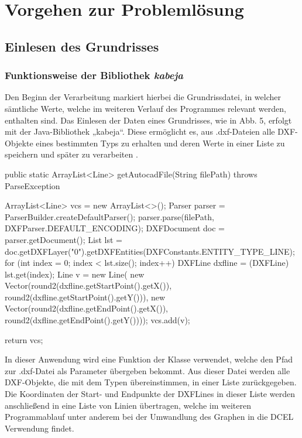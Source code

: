 \chapter{Vorgehen zur Problemlösung}
\section{Einlesen des Grundrisses}

\subsection{Funktionsweise der Bibliothek \textit{kabeja}}
Den Beginn der Verarbeitung markiert hierbei die Grundrissdatei, in welcher sämtliche Werte, welche im weiteren Verlauf des Programmes relevant werden, enthalten sind.
Das Einlesen der Daten eines Grundrisses, wie in Abb. 5, erfolgt mit der Java-Bibliothek „kabeja“. 
Diese ermöglicht es, aus .dxf-Dateien alle DXF-Objekte eines bestimmten Typs zu erhalten und deren Werte in einer Liste zu speichern und später zu verarbeiten \cite{kabeja}.
\begin{code}
public static ArrayList<Line> getAutocadFile(String filePath) throws ParseException {
	ArrayList<Line> vcs = new ArrayList<>();
	Parser parser = ParserBuilder.createDefaultParser();
	parser.parse(filePath, DXFParser.DEFAULT_ENCODING);
	DXFDocument doc = parser.getDocument();
	List lst = doc.getDXFLayer("0").getDXFEntities(DXFConstants.ENTITY_TYPE_LINE);
	for (int index = 0; index < lst.size(); index++) {
		DXFLine dxfline = (DXFLine) lst.get(index);
		Line v = new Line(
		new Vector(round2(dxfline.getStartPoint().getX()), round2(dxfline.getStartPoint().getY())),
		new Vector(round2(dxfline.getEndPoint().getX()), round2(dxfline.getEndPoint().getY())));
		vcs.add(v);
	}
	
	return vcs;
}
\end{code}


In dieser Anwendung wird eine Funktion der Klasse  verwendet, welche den Pfad zur .dxf-Datei als Parameter übergeben bekommt. 
Aus dieser Datei werden alle DXF-Objekte, die mit dem Typen  übereinstimmen, in einer Liste zurückgegeben. 
Die Koordinaten der Start- und Endpunkte der DXFLines  in dieser Liste werden anschließend in eine Liste von Linien übertragen, welche im weiteren Programmablauf unter anderem bei der Umwandlung des Graphen in die DCEL Verwendung findet.

